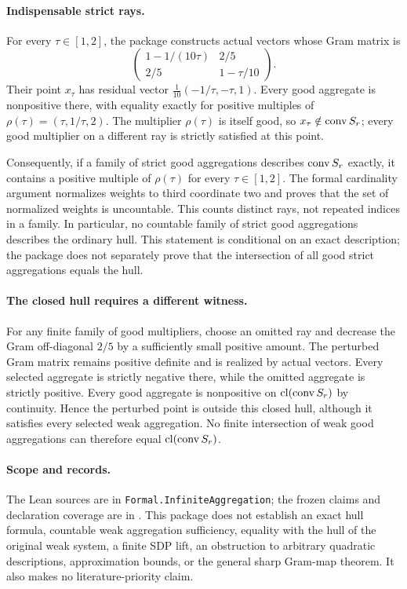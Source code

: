 \paragraph{Indispensable strict rays.}
For every $\tau\in[1,2]$, the package constructs actual vectors whose Gram
matrix is
\[
 \begin{pmatrix}
 1-1/(10\tau)&2/5\\2/5&1-\tau/10
 \end{pmatrix}.
\]
Their point $x_\tau$ has residual vector
$\frac1{10}(-1/\tau,-\tau,1)$. Every good aggregate is nonpositive there,
with equality exactly for positive multiples of
$\rho(\tau)=(\tau,1/\tau,2)$. The multiplier $\rho(\tau)$ is itself good,
so $x_\tau\notin\operatorname{conv} S_r$; every good multiplier on a different ray is
strictly satisfied at this point.

Consequently, if a family of strict good aggregations describes
$\operatorname{conv} S_r$ exactly, it contains a positive multiple of $\rho(\tau)$ for
every $\tau\in[1,2]$. The formal cardinality argument normalizes weights
to third coordinate two and proves that the set of normalized weights is
uncountable. This counts distinct rays, not repeated indices in a family.
In particular, no countable family of strict good aggregations describes
the ordinary hull. This statement is conditional on an exact description;
the package does not separately prove that the intersection of all good
strict aggregations equals the hull.

\paragraph{The closed hull requires a different witness.}
For any finite family of good multipliers, choose an omitted ray and
decrease the Gram off-diagonal $2/5$ by a sufficiently small positive
amount. The perturbed Gram matrix remains positive definite and is
realized by actual vectors. Every selected aggregate is strictly negative
there, while the omitted aggregate is strictly positive. Every good
aggregate is nonpositive on $\operatorname{cl}(\operatorname{conv} S_r)$ by continuity. Hence the
perturbed point is outside this closed hull, although it satisfies every
selected weak aggregation. No finite intersection of weak good
aggregations can therefore equal $\operatorname{cl}(\operatorname{conv} S_r)$.

\paragraph{Scope and records.}
The Lean sources are in \texttt{Formal.InfiniteAggregation}; the frozen
claims and declaration coverage are in .
This package does not establish an exact hull formula, countable weak
aggregation sufficiency, equality with the hull of the original weak
system, a finite SDP lift, an obstruction to arbitrary quadratic
descriptions, approximation bounds, or the general sharp Gram-map theorem.
It also makes no literature-priority claim.
